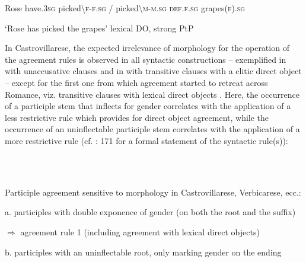 \documentclass[output=paper]{langscibook}
\begin{document}
\begin{styleTabellaLUNGA}
    Rose   have.3\textsc{sg}   picked{\textbackslash}\textsc{f}{}-\textsc{f.sg}  /   picked{\textbackslash}\textsc{m-m.sg}  \textsc{def.f.sg}   grapes(\textsc{f}).\textsc{sg}
\end{styleTabellaLUNGA}

\begin{styleTabellaLUNGA}
    ‘Rose has picked the grapes’               lexical DO, strong PtP
\end{styleTabellaLUNGA}

In Castrovillarese, the expected irrelevance of morphology for the operation of the agreement rules is observed in all syntactic constructions – exemplified in  with unaccusative clauses and in  with transitive clauses with a clitic direct object – except for the first one from which agreement started to retreat across Romance, viz. transitive clauses with lexical direct objects . Here, the occurrence of a participle stem that inflects for gender  correlates with the application of a less restrictive rule  which provides for direct object agreement, while the occurrence of an uninflectable participle stem  correlates with the application of a more restrictive rule  (cf. \citealt{Loporcaro2010b}: 171 for a formal statement of the syntactic rule(s)):

\begin{styleTabella}
\ea%
    \label{ex:key:28}
    \gll \\
         \\
    \glt
    \z %

          Participle agreement sensitive to morphology in Castrovillarese, Verbicarese, ecc.:
\end{styleTabella}

\begin{styleTabellaLUNGA}
  a.  participles with double exponence of gender (on both the root and the suffix)
\end{styleTabellaLUNGA}

\begin{styleTabellaLUNGA}
    $\Rightarrow $ agreement rule 1 (including agreement with lexical direct objects)
\end{styleTabellaLUNGA}

\begin{styleTabellaLUNGA}
  b.  participles with an uninflectable root, only marking gender on the ending
\end{styleTabellaLUNGA}
\end{document}
